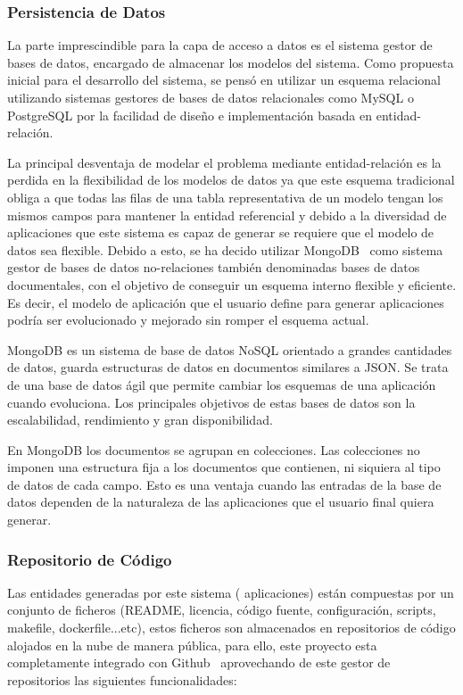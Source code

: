 \documentclass[a4paper,11pt]{book}
\begin{document}
\subsubsection{Persistencia de Datos}
La parte imprescindible para la capa de acceso a datos es el sistema gestor de bases de datos, encargado de almacenar los modelos del sistema. Como propuesta inicial para el desarrollo del sistema, se pensó en utilizar un esquema relacional utilizando sistemas gestores de bases de datos relacionales como MySQL o PostgreSQL  por la facilidad de diseño e implementación basada en entidad-relación.

La principal desventaja de modelar el problema mediante entidad-relación es la perdida en la flexibilidad de los modelos de datos ya que este esquema tradicional obliga a que todas las filas de una tabla representativa de un modelo tengan los mismos campos para mantener la entidad referencial y debido a la diversidad de aplicaciones que este sistema es capaz de generar se requiere que el modelo de datos sea flexible. Debido a esto, se ha decido utilizar MongoDB~\cite{mg} como sistema gestor de bases de datos no-relaciones también denominadas bases de datos documentales, con el objetivo de conseguir un esquema interno flexible y eficiente. Es decir, el modelo de aplicación que el usuario define para generar aplicaciones podría ser evolucionado y mejorado sin romper el esquema actual. 

MongoDB es un sistema de base de datos NoSQL orientado a grandes cantidades de datos, guarda estructuras de datos en documentos similares a JSON. Se trata de una base de datos ágil que permite cambiar los esquemas de una aplicación cuando evoluciona. Los principales objetivos de estas bases de datos son la escalabilidad, rendimiento y gran disponibilidad.

En MongoDB los documentos se agrupan en colecciones. Las colecciones  no imponen una estructura fija a los documentos que contienen, ni siquiera al tipo de datos de cada campo. Esto es una ventaja cuando las entradas de la base de datos dependen de la naturaleza de las aplicaciones que el usuario final quiera generar.


\subsubsection{Repositorio de Código}\label{repo}

Las entidades generadas por este sistema ( aplicaciones) están compuestas por un conjunto de ficheros (README, licencia, código fuente, configuración, scripts, makefile, dockerfile...etc), estos ficheros son almacenados en repositorios de código alojados en la nube de manera pública, para ello, este proyecto esta completamente integrado con Github~\cite{github} aprovechando de este gestor de repositorios las siguientes funcionalidades: 
\end{document}
